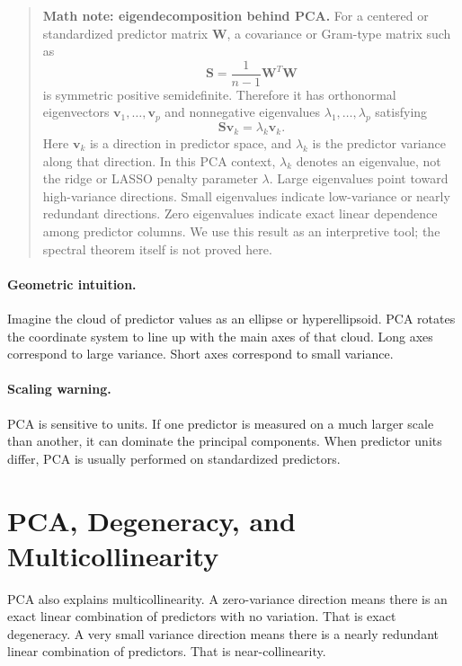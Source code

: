 \begin{quote}
\textbf{Math note: eigendecomposition behind PCA.}
For a centered or standardized predictor matrix \(\mathbf{W}\), a covariance or Gram-type matrix such as
\begin{equation}
  \mathbf{S}=\frac{1}{n-1}\mathbf{W}^T\mathbf{W}
  \label{eq:ch16-pca-covariance-gram}
\end{equation}
is symmetric positive semidefinite.  Therefore it has orthonormal eigenvectors \(\mathbf{v}_1,\ldots,\mathbf{v}_p\) and nonnegative eigenvalues \(\lambda_1,\ldots,\lambda_p\) satisfying
\begin{equation}
  \mathbf{S}\mathbf{v}_k=\lambda_k\mathbf{v}_k.
  \label{eq:ch16-pca-eigen-equation}
\end{equation}
Here \(\mathbf{v}_k\) is a direction in predictor space, and \(\lambda_k\) is the predictor variance along that direction.  In this PCA context, \(\lambda_k\) denotes an eigenvalue, not the ridge or LASSO penalty parameter \(\lambda\).  Large eigenvalues point toward high-variance directions.  Small eigenvalues indicate low-variance or nearly redundant directions.  Zero eigenvalues indicate exact linear dependence among predictor columns.  We use this result as an interpretive tool; the spectral theorem itself is not proved here.
\end{quote}

\paragraph{Geometric intuition.}
Imagine the cloud of predictor values as an ellipse or hyperellipsoid.  PCA rotates the coordinate system to line up with the main axes of that cloud.  Long axes correspond to large variance.  Short axes correspond to small variance.

\paragraph{Scaling warning.}
PCA is sensitive to units.  If one predictor is measured on a much larger scale than another, it can dominate the principal components.  When predictor units differ, PCA is usually performed on standardized predictors.

\section{PCA, Degeneracy, and Multicollinearity}

PCA also explains multicollinearity.  A zero-variance direction means there is an exact linear combination of predictors with no variation.  That is exact degeneracy.  A very small variance direction means there is a nearly redundant linear combination of predictors.  That is near-collinearity.

